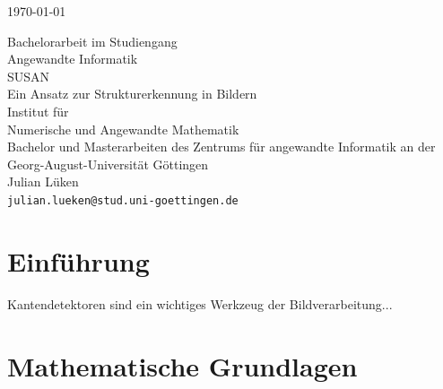 \documentclass[a4paper, 11pt]{report}
\newcommand{\mytitle}[1]{\LARGE{#1}\normalsize}
\newcommand{\titlespace}{\vspace{2.5em}}
\newcommand{\hugespace}{\vspace{22em}}
\theoremstyle{definition}
\newenvironment{myAbstract}{\section*{Abstract}}{}
\begin{document}
\begin{titlepage}
	\begin{center}
		\begin{minipage}{.49\textwidth}
			\flushleft
			
		\end{minipage}
		\begin{minipage}{.49\textwidth}
			\flushright
			\today\\
			\phantom{1}
		\end{minipage}
		\begin{minipage}{.49\textwidth}
			\begin{center}
				\vspace{2cm}
				Bachelorarbeit im Studiengang\\
				\glqq Angewandte Informatik\grqq{}\\
				\titlespace
				\mytitle{SUSAN}\\
				Ein Ansatz zur Strukturerkennung in Bildern\\
				\hugespace
				Institut für\\Numerische und Angewandte Mathematik\\
				\titlespace
				Bachelor und Masterarbeiten des Zentrums für angewandte Informatik an der Georg-August-Universität Göttingen\\
				\titlespace
				Julian Lüken\\
				\texttt{julian.lueken@stud.uni-goettingen.de}\\
			\end{center}
		\end{minipage}
	\end{center}
\end{titlepage}

\restoregeometry
{}
\pagestyle{empty}


\tableofcontents
\pagebreak
\restoregeometry
\pagestyle{headings}

\chapter{Einführung}
	Kantendetektoren sind ein wichtiges Werkzeug der Bildverarbeitung...

\chapter{Mathematische Grundlagen}
\end{document}
